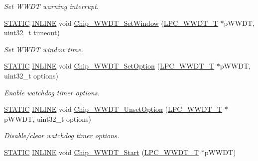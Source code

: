 \begin{DoxyCompactItemize}
\begin{DoxyCompactList}\small\item\em Set W\+W\+DT warning interrupt. \end{DoxyCompactList}\item 
\hyperlink{group___l_p_c___types___public___macros_ga10b2d890d871e1489bb02b7e70d9bdfb}{S\+T\+A\+T\+IC} \hyperlink{spifi__18xx__43xx_8h_a2eb6f9e0395b47b8d5e3eeae4fe0c116}{I\+N\+L\+I\+NE} void \hyperlink{group___w_w_d_t__18_x_x__43_x_x_gaad121c7d4960ceec5626e8bad047c966}{Chip\+\_\+\+W\+W\+D\+T\+\_\+\+Set\+Window} (\hyperlink{struct_l_p_c___w_w_d_t___t}{L\+P\+C\+\_\+\+W\+W\+D\+T\+\_\+T} $\ast$p\+W\+W\+DT, uint32\+\_\+t timeout)
\begin{DoxyCompactList}\small\item\em Set W\+W\+DT window time. \end{DoxyCompactList}\item 
\hyperlink{group___l_p_c___types___public___macros_ga10b2d890d871e1489bb02b7e70d9bdfb}{S\+T\+A\+T\+IC} \hyperlink{spifi__18xx__43xx_8h_a2eb6f9e0395b47b8d5e3eeae4fe0c116}{I\+N\+L\+I\+NE} void \hyperlink{group___w_w_d_t__18_x_x__43_x_x_gab1908a91ca65434f14402e4a8373091f}{Chip\+\_\+\+W\+W\+D\+T\+\_\+\+Set\+Option} (\hyperlink{struct_l_p_c___w_w_d_t___t}{L\+P\+C\+\_\+\+W\+W\+D\+T\+\_\+T} $\ast$p\+W\+W\+DT, uint32\+\_\+t options)
\begin{DoxyCompactList}\small\item\em Enable watchdog timer options. \end{DoxyCompactList}\item 
\hyperlink{group___l_p_c___types___public___macros_ga10b2d890d871e1489bb02b7e70d9bdfb}{S\+T\+A\+T\+IC} \hyperlink{spifi__18xx__43xx_8h_a2eb6f9e0395b47b8d5e3eeae4fe0c116}{I\+N\+L\+I\+NE} void \hyperlink{group___w_w_d_t__18_x_x__43_x_x_gae71f59b4d6dfa847411bc74f5467946c}{Chip\+\_\+\+W\+W\+D\+T\+\_\+\+Unset\+Option} (\hyperlink{struct_l_p_c___w_w_d_t___t}{L\+P\+C\+\_\+\+W\+W\+D\+T\+\_\+T} $\ast$p\+W\+W\+DT, uint32\+\_\+t options)
\begin{DoxyCompactList}\small\item\em Disable/clear watchdog timer options. \end{DoxyCompactList}\item 
\hyperlink{group___l_p_c___types___public___macros_ga10b2d890d871e1489bb02b7e70d9bdfb}{S\+T\+A\+T\+IC} \hyperlink{spifi__18xx__43xx_8h_a2eb6f9e0395b47b8d5e3eeae4fe0c116}{I\+N\+L\+I\+NE} void \hyperlink{group___w_w_d_t__18_x_x__43_x_x_gacae3a80bfc9430604c434d073230f577}{Chip\+\_\+\+W\+W\+D\+T\+\_\+\+Start} (\hyperlink{struct_l_p_c___w_w_d_t___t}{L\+P\+C\+\_\+\+W\+W\+D\+T\+\_\+T} $\ast$p\+W\+W\+DT)

\end{DoxyCompactItemize}

